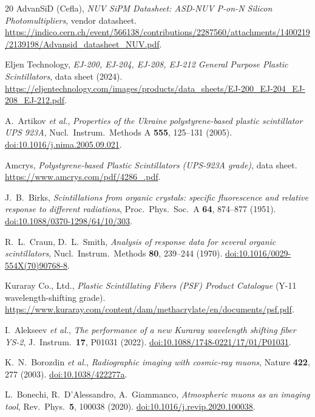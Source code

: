 \documentclass[11pt,a4paper]{article}
\begin{document}
\begin{thebibliography}{20}
AdvanSiD (Cefla),
\emph{NUV SiPM Datasheet: ASD-NUV P-on-N Silicon Photomultipliers}, vendor datasheet.
\url{https://indico.cern.ch/event/566138/contributions/2287560/attachments/1400219/2139198/Advansid_datasheet_NUV.pdf}.

Eljen Technology,
\emph{EJ-200, EJ-204, EJ-208, EJ-212 General Purpose Plastic Scintillators},
data sheet (2024).
\url{https://eljentechnology.com/images/products/data_sheets/EJ-200_EJ-204_EJ-208_EJ-212.pdf}.

A.~Artikov \emph{et al.},
\emph{Properties of the Ukraine polystyrene-based plastic scintillator UPS 923A},
Nucl.\ Instrum.\ Methods A \textbf{555}, 125--131 (2005).
\href{https://doi.org/10.1016/j.nima.2005.09.021}{doi:10.1016/j.nima.2005.09.021}.

Amcrys,
\emph{Polystyrene-based Plastic Scintillators (UPS-923A grade)}, data sheet.
\url{https://www.amcrys.com/pdf/4286_.pdf}.

J.~B.~Birks,
\emph{Scintillations from organic crystals: specific fluorescence and relative
response to different radiations},
Proc.\ Phys.\ Soc.\ A \textbf{64}, 874--877 (1951).
\href{https://doi.org/10.1088/0370-1298/64/10/303}{doi:10.1088/0370-1298/64/10/303}.

R.~L.~Craun, D.~L.~Smith,
\emph{Analysis of response data for several organic scintillators},
Nucl.\ Instrum.\ Methods \textbf{80}, 239--244 (1970).
\href{https://doi.org/10.1016/0029-554X(70)90768-8}{doi:10.1016/0029-554X(70)90768-8}.

Kuraray Co., Ltd.,
\emph{Plastic Scintillating Fibers (PSF) Product Catalogue}
(Y-11 wavelength-shifting grade).
\url{https://www.kuraray.com/content/dam/methacrylate/en/documents/psf.pdf}.

I.~Alekseev \emph{et al.},
\emph{The performance of a new Kuraray wavelength shifting fiber YS-2},
J.\ Instrum.\ \textbf{17}, P01031 (2022).
\href{https://doi.org/10.1088/1748-0221/17/01/P01031}{doi:10.1088/1748-0221/17/01/P01031}.

K.~N.~Borozdin \emph{et al.},
\emph{Radiographic imaging with cosmic-ray muons},
Nature \textbf{422}, 277 (2003).
\href{https://doi.org/10.1038/422277a}{doi:10.1038/422277a}.

L.~Bonechi, R.~D'Alessandro, A.~Giammanco,
\emph{Atmospheric muons as an imaging tool},
Rev.\ Phys.\ \textbf{5}, 100038 (2020).
\href{https://doi.org/10.1016/j.revip.2020.100038}{doi:10.1016/j.revip.2020.100038}.


\end{thebibliography}
\end{document}
